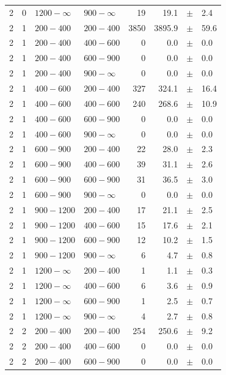 \begin{table}[!t]
\begin{tabular}{rrllrrcl}
2 & 0 & $1200- \infty$ & $900-\infty$ &     19 &     19.1 &$\pm$&    2.4 \\
2 & 1 & $ 200- 400$ & $200-400$ &   3850 &   3895.9 &$\pm$&   59.6 \\
2 & 1 & $ 200- 400$ & $400-600$ &      0 &      0.0 &$\pm$&    0.0 \\
2 & 1 & $ 200- 400$ & $600-900$ &      0 &      0.0 &$\pm$&    0.0 \\
2 & 1 & $ 200- 400$ & $900-\infty$ &      0 &      0.0 &$\pm$&    0.0 \\
2 & 1 & $ 400- 600$ & $200-400$ &    327 &    324.1 &$\pm$&   16.4 \\
2 & 1 & $ 400- 600$ & $400-600$ &    240 &    268.6 &$\pm$&   10.9 \\
2 & 1 & $ 400- 600$ & $600-900$ &      0 &      0.0 &$\pm$&    0.0 \\
2 & 1 & $ 400- 600$ & $900-\infty$ &      0 &      0.0 &$\pm$&    0.0 \\
2 & 1 & $ 600- 900$ & $200-400$ &     22 &     28.0 &$\pm$&    2.3 \\
2 & 1 & $ 600- 900$ & $400-600$ &     39 &     31.1 &$\pm$&    2.6 \\
2 & 1 & $ 600- 900$ & $600-900$ &     31 &     36.5 &$\pm$&    3.0 \\
2 & 1 & $ 600- 900$ & $900-\infty$ &      0 &      0.0 &$\pm$&    0.0 \\
2 & 1 & $ 900-1200$ & $200-400$ &     17 &     21.1 &$\pm$&    2.5 \\
2 & 1 & $ 900-1200$ & $400-600$ &     15 &     17.6 &$\pm$&    2.1 \\
2 & 1 & $ 900-1200$ & $600-900$ &     12 &     10.2 &$\pm$&    1.5 \\
2 & 1 & $ 900-1200$ & $900-\infty$ &      6 &      4.7 &$\pm$&    0.8 \\
2 & 1 & $1200- \infty$ & $200-400$ &      1 &      1.1 &$\pm$&    0.3 \\
2 & 1 & $1200- \infty$ & $400-600$ &      6 &      3.6 &$\pm$&    0.9 \\
2 & 1 & $1200- \infty$ & $600-900$ &      1 &      2.5 &$\pm$&    0.7 \\
2 & 1 & $1200- \infty$ & $900-\infty$ &      4 &      2.7 &$\pm$&    0.8 \\
2 & 2 & $ 200- 400$ & $200-400$ &    254 &    250.6 &$\pm$&    9.2 \\
2 & 2 & $ 200- 400$ & $400-600$ &      0 &      0.0 &$\pm$&    0.0 \\
2 & 2 & $ 200- 400$ & $600-900$ &      0 &      0.0 &$\pm$&    0.0 \\

\end{tabular}
\end{table}
